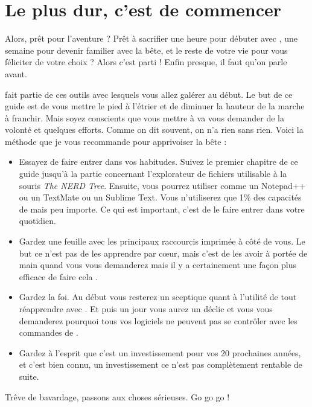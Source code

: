 \section{Le plus dur, c'est de commencer}

Alors, prêt pour l'aventure ? Prêt à sacrifier une heure pour débuter avec \vim, une semaine pour devenir familier avec la bête, et le reste de votre vie pour vous féliciter de votre choix ? Alors c'est parti ! Enfin presque, il faut qu'on parle avant.

\vim fait partie de ces outils avec lesquels vous allez galérer au début. Le but de ce guide est de vous mettre le pied à l'étrier et de diminuer la hauteur de la marche à franchir. Mais soyez conscients que vous mettre à \vim va vous demander de la volonté et quelques efforts. Comme on dit souvent, on n'a rien sans rien. Voici la méthode que je vous recommande pour apprivoiser la bête :

\begin{itemize}
    \item Essayez de faire entrer \vim dans vos habitudes. Suivez le premier chapitre de ce guide jusqu'à la partie concernant l'explorateur de fichiers utilisable à la souris \emph{The NERD Tree}. Ensuite, vous pourrez utiliser \vim comme un Notepad++ ou un TextMate ou un Sublime Text. Vous n'utiliserez que 1\% des capacités de \vim mais peu importe. Ce qui est important, c'est de le faire entrer dans votre quotidien.
    \item Gardez une feuille avec les principaux raccourcis imprimée à côté de vous. Le but ce n'est pas de les apprendre par cœur, mais c'est de les avoir à portée de main quand vous vous demanderez \og mais il y a certainement une façon plus efficace de faire cela \fg.
    \item Gardez la foi. Au début vous resterez un sceptique quant à l'utilité de tout réapprendre avec \vim. Et puis un jour vous aurez un déclic et vous vous demanderez pourquoi tous vos logiciels ne peuvent pas se contrôler avec les commandes de \vim.
    \item Gardez à l'esprit que c'est un investissement pour vos 20 prochaines années, et c'est bien connu, un investissement ce n'est pas complètement rentable de suite.
\end{itemize}

\bigskip

Trêve de bavardage, passons aux choses sérieuses. Go go go !
